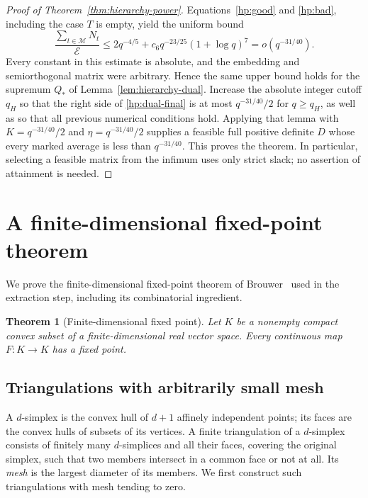\documentclass[11pt]{amsart}
\newtheorem{theorem}{Theorem}[section]
\theoremstyle{definition}
\theoremstyle{remark}
\numberwithin{equation}{section}
\begin{document}
\begin{proof}[Proof of Theorem~\ref{thm:hierarchy-power}]
Equations~\eqref{hp:good} and \eqref{hp:bad}, including the case $T$
is empty, yield the uniform bound
\begin{equation}\label{hp:dual-final}
 \frac{\sum_{t\in\mathcal M}N_t}{\mathcal E}
 \le2q^{-4/5}+c_6q^{-23/25}(1+\log q)^7
 =o(q^{-31/40}).
\end{equation}
Every constant in this estimate is absolute, and the embedding and
semiorthogonal matrix were arbitrary.  Hence the same upper bound holds
for the supremum $Q_*$ of Lemma~\ref{lem:hierarchy-dual}.  Increase
the absolute integer cutoff $q_H$ so that the right side of
\eqref{hp:dual-final} is at most $q^{-31/40}/2$ for $q\ge q_H$, as well
as so that all previous numerical conditions hold.
Applying that lemma with $K=q^{-31/40}/2$ and
$\eta=q^{-31/40}/2$ supplies a feasible full positive definite $D$
whose every marked average is less than $q^{-31/40}$.
This proves the theorem.  In particular, selecting a feasible matrix
from the infimum uses only strict slack; no assertion of attainment is
needed.
\end{proof}

\section{A finite-dimensional fixed-point theorem}
\label{sec:fixedpoint}

We prove the finite-dimensional fixed-point theorem of
Brouwer~\cite{Brouwer} used in the extraction step, including its
combinatorial ingredient.

\begin{theorem}[Finite-dimensional fixed point]\label{thm:fixedpoint}
Let \(K\) be a nonempty compact convex subset of a finite-dimensional
real vector space. Every continuous map \(F:K\to K\) has a fixed point.
\end{theorem}

\subsection{Triangulations with arbitrarily small mesh}

A \(d\)-simplex is the convex hull of \(d+1\) affinely independent
points; its faces are the convex hulls of subsets of its vertices.
A finite triangulation of a \(d\)-simplex consists of finitely many
\(d\)-simplices and all their faces, covering the original simplex,
such that two members intersect in a common face or not at all.
Its \emph{mesh} is the largest diameter of its members.
We first construct such triangulations with mesh tending to zero.
\end{document}
